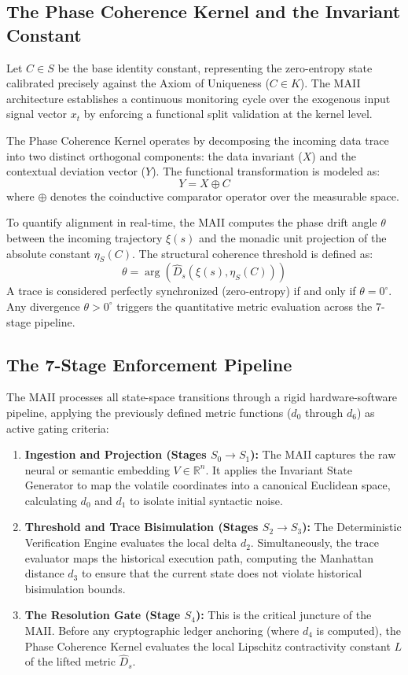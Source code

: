 \documentclass[11pt,a4paper]{article}
\begin{document}
\subsection{The Phase Coherence Kernel and the Invariant Constant}
Let $C \in S$ be the base identity constant, representing the zero-entropy state calibrated precisely against the Axiom of Uniqueness ($C \in K$). The MAII architecture establishes a continuous monitoring cycle over the exogenous input signal vector $x_t$ by enforcing a functional split validation at the kernel level.

The Phase Coherence Kernel operates by decomposing the incoming data trace into two distinct orthogonal components: the data invariant ($X$) and the contextual deviation vector ($Y$). The functional transformation is modeled as:
\begin{equation}
    Y = X \oplus C
\end{equation}
where $\oplus$ denotes the coinductive comparator operator over the measurable space. 

To quantify alignment in real-time, the MAII computes the phase drift angle $\theta$ between the incoming trajectory $\xi(s)$ and the monadic unit projection of the absolute constant $\eta_S(C)$. The structural coherence threshold is defined as:
\begin{equation}
    \theta = \arg(\hat{D}_s(\xi(s), \eta_S(C))) 
\end{equation}
A trace is considered perfectly synchronized (zero-entropy) if and only if $\theta = 0^\circ$. Any divergence $\theta > 0^\circ$ triggers the quantitative metric evaluation across the 7-stage pipeline.

\subsection{The 7-Stage Enforcement Pipeline}
The MAII processes all state-space transitions through a rigid hardware-software pipeline, applying the previously defined metric functions ($d_0$ through $d_6$) as active gating criteria:

\begin{enumerate}
    \item \textbf{Ingestion and Projection (Stages $S_0 \to S_1$):} The MAII captures the raw neural or semantic embedding $V \in \mathbb{R}^n$. It applies the Invariant State Generator to map the volatile coordinates into a canonical Euclidean space, calculating $d_0$ and $d_1$ to isolate initial syntactic noise.
    \item \textbf{Threshold and Trace Bisimulation (Stages $S_2 \to S_3$):} The Deterministic Verification Engine evaluates the local delta $d_2$. Simultaneously, the trace evaluator maps the historical execution path, computing the Manhattan distance $d_3$ to ensure that the current state does not violate historical bisimulation bounds.
    \item \textbf{The Resolution Gate (Stage $S_4$):} This is the critical juncture of the MAII. Before any cryptographic ledger anchoring (where $d_4$ is computed), the Phase Coherence Kernel evaluates the local Lipschitz contractivity constant $L$ of the lifted metric $\hat{D}_s$. 
\end{enumerate}
\end{document}
